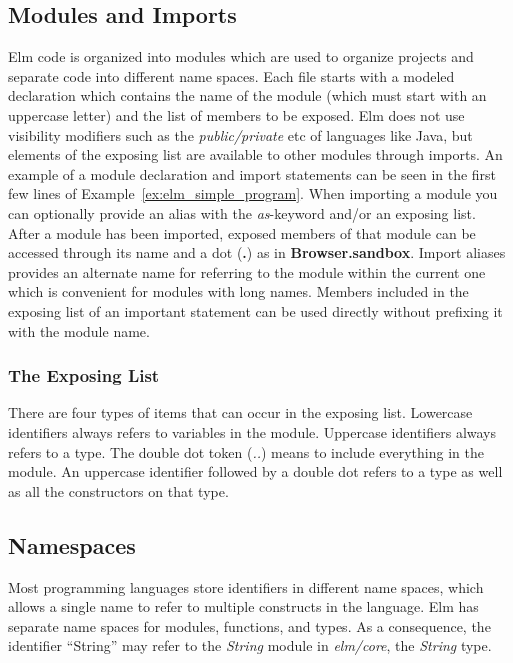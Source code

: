 \documentclass[../thesis.tex]{subfiles}
\begin{document}
\subsection{Modules and Imports}
Elm code is organized into modules which are used to organize projects
and separate code into different name spaces.
Each file starts with a modeled declaration which contains the name of the module (which must start with an uppercase letter)
and the list of members to be exposed.
Elm does not use visibility modifiers such as the \textit{public/private} etc of languages
like Java, but elements of the exposing list are available to other modules through imports.
An example of a module declaration and import statements can be seen in the first few lines of Example~\ref{ex:elm_simple_program}.
When importing a module you can optionally provide an alias with the \textit{as}-keyword
and/or an exposing list.
After a module has been imported, exposed members of that module can be accessed
through its name and a dot (\textbf{.}) as in \textbf{Browser.sandbox}.
Import aliases provides an alternate name for referring to the module within the current one
which is convenient for modules with long names.
Members included in the exposing list of an important statement can be used directly
without prefixing it with the module name.

\subsubsection{The Exposing List}
There are four types of items that can occur in the exposing list.
Lowercase identifiers always refers to variables in the module.
Uppercase identifiers always refers to a type.
The double dot token (\textit{..}) means to include everything in the module.
An uppercase identifier followed by a double dot refers to a type as well as all the constructors on that type.

\subsection{Namespaces}
Most programming languages store identifiers in different name spaces, which allows a single name
to refer to multiple constructs in the language.
Elm has separate name spaces for modules, functions, and types.
As a consequence, the identifier ``String'' may refer to the \textit{String} module in \textit{elm/core}, the \textit{String} type.
\end{document}
